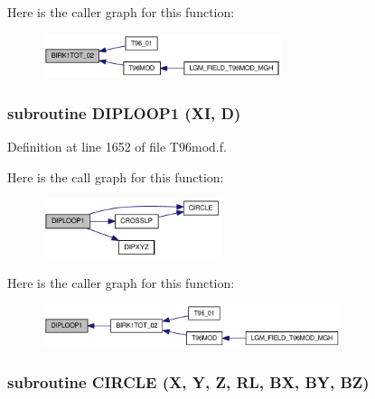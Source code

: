Here is the caller graph for this function:\nopagebreak
\begin{figure}[H]
\begin{center}
\leavevmode
\includegraphics[width=197pt]{_t96mod_8f_1d35065857c1597a4d45699d6e30faa9_icgraph}
\end{center}
\end{figure}
\hypertarget{_t96mod_8f_7634ccf219c90ebc36de1b55b961ed88}{
\subsubsection[{DIPLOOP1}]{\setlength{\rightskip}{0pt plus 5cm}subroutine DIPLOOP1 (XI, \/  D)}}
\label{_t96mod_8f_7634ccf219c90ebc36de1b55b961ed88}




Definition at line 1652 of file T96mod.f.

Here is the call graph for this function:\nopagebreak
\begin{figure}[H]
\begin{center}
\leavevmode
\includegraphics[width=148pt]{_t96mod_8f_7634ccf219c90ebc36de1b55b961ed88_cgraph}
\end{center}
\end{figure}


Here is the caller graph for this function:\nopagebreak
\begin{figure}[H]
\begin{center}
\leavevmode
\includegraphics[width=247pt]{_t96mod_8f_7634ccf219c90ebc36de1b55b961ed88_icgraph}
\end{center}
\end{figure}
\hypertarget{_t96mod_8f_7ad3cc17a6906d0de0ea87905c8adfa0}{
\subsubsection[{CIRCLE}]{\setlength{\rightskip}{0pt plus 5cm}subroutine CIRCLE (X, \/  Y, \/  Z, \/  RL, \/  BX, \/  BY, \/  BZ)}}
\label{_t96mod_8f_7ad3cc17a6906d0de0ea87905c8adfa0}




